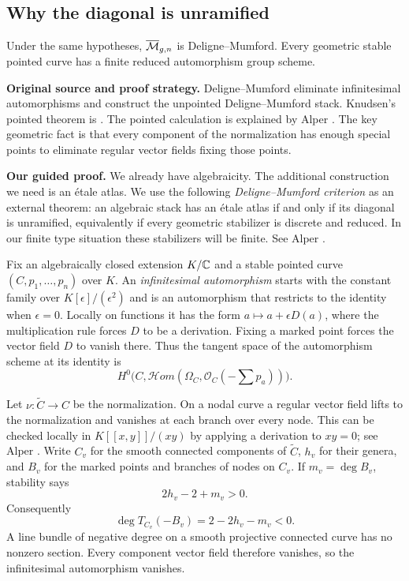 \subsection{Why the diagonal is unramified}

\begin{Prop}\label{prop:curves-dm}
Under the same hypotheses, $\overline{\mathcal M}_{g,n}$ is Deligne--Mumford.
Every geometric stable pointed curve has a finite reduced
automorphism group scheme.
\end{Prop}

\noindent\textbf{Original source and proof strategy.}
Deligne--Mumford \cite[Lemma (1.4), pp.~80--81, Theorem (1.11),
p.~84, and Proposition (5.1), p.~104]{DM} eliminate infinitesimal
automorphisms and construct the unpointed Deligne--Mumford stack.
Knudsen's pointed theorem is \cite[Theorem 2.7, p.~179]{Knudsen}.
The pointed calculation is explained by Alper
\cite[Proposition 6.3.26, pp.~232--235, and Theorem 6.4.16,
p.~241]{Alper}. The key geometric fact is that every component of
the normalization has enough special points to eliminate regular
vector fields fixing those points.

\medskip
\noindent\textbf{Our guided proof.}
We already have algebraicity. The additional construction we need
is an \'etale atlas. We use the following \emph{Deligne--Mumford
criterion} as an external theorem: an algebraic stack has an
\'etale atlas if and only if its diagonal is unramified, equivalently
if every geometric stabilizer is discrete and reduced. In our
finite type situation these stabilizers will be finite.
See Alper \cite[Theorem 4.6.4, p.~143]{Alper}.

Fix an algebraically closed extension $K/\mathbb C$ and a stable pointed
curve $(C,p_1,\ldots,p_n)$ over $K$. An \emph{infinitesimal
automorphism} starts with the constant family over
$K[\epsilon]/(\epsilon^2)$ and is an automorphism that restricts
to the identity when $\epsilon=0$. Locally on functions it has
the form $a\mapsto a+\epsilon D(a)$, where the multiplication
rule forces $D$ to be a derivation. Fixing a marked point forces
the vector field $D$ to vanish there. Thus the tangent space of
the automorphism scheme at its identity is
\[
 H^0\bigl(C,\mathcal Hom(\Omega_C,\mathcal O_C(-\sum p_a))\bigr).
\]

Let $\nu:\widetilde C\to C$ be the normalization. On a nodal
curve a regular vector field lifts to the normalization and
vanishes at each branch over every node. This can be checked
locally in $K[[x,y]]/(xy)$ by applying a derivation to $xy=0$;
see Alper \cite[Exercise 6.2.22, p.~221]{Alper}.
Write $C_v$ for the smooth connected components of $\widetilde C$,
$h_v$ for their genera, and $B_v$ for the marked points and
branches of nodes on $C_v$. If $m_v=\deg B_v$, stability says
\[
                  2h_v-2+m_v>0.
\]
Consequently
\[
 \deg T_{C_v}(-B_v)=2-2h_v-m_v<0.
\]
A line bundle of negative degree on a smooth projective connected
curve has no nonzero section. Every component vector field
therefore vanishes, so the infinitesimal automorphism vanishes.

